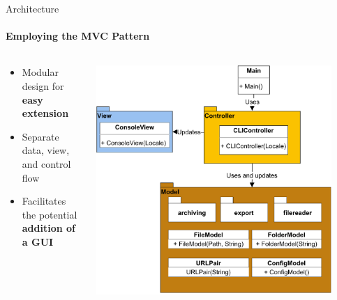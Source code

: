 \documentclass[
ngerman,%
authorontitle=true,
]{bfhbeamer}
\begin{document}
	\begin{frame}{Architecture}
		\framesubtitle{Employing the \textbf{MVC} Pattern}
		
		\begin{columns} %
			\begin{column}{0.5\textwidth} %
				\begin{itemize}
					\item Modular design for \textbf{easy extension}
					\item Separate data, view, and control flow
					\item Facilitates the potential \textbf{addition of a GUI}
				\end{itemize}
			\end{column}
			
			\begin{column}{0.5\textwidth} %
				\begin{center}
					\includegraphics[width=0.9\textwidth]{pictures/final_presentation/mvc_diagram-Highlevel_MV_Presentation.pdf}
				\end{center}
			\end{column}
		\end{columns} %
	\end{frame}
	
\end{document}
